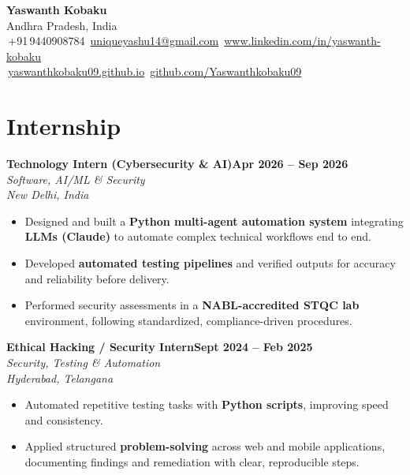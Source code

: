 \documentclass[a4paper,10pt]{article}
\newcommand{\linkedinicon}{\raisebox{-0.15ex}{\colorbox{accent}{\textcolor{white}{\scriptsize\textbf{in}}}}}
\newcommand{\entryloc}[4]{\textbf{#1}\hfill\textbf{#3}\\[1pt]{\itshape #2}\\{\itshape #4}\par\vspace{2pt}}
\begin{document}
\begin{center}
  {\LARGE\bfseries Yaswanth Kobaku}\\[2pt]
  Andhra Pradesh, India\\[2pt]
  {\small \Telefon\,+91\,9440908784 \quad \Letter\,\href{mailto:uniqueyashu14@gmail.com}{uniqueyashu14@gmail.com} \quad \linkedinicon\,\href{https://www.linkedin.com/in/yaswanth-kobaku}{www.linkedin.com/in/yaswanth-kobaku}}\\[2pt]
  {\small \Mundus\,\href{https://yaswanthkobaku09.github.io/}{yaswanthkobaku09.github.io} \quad \ComputerMouse\,\href{https://github.com/Yaswanthkobaku09}{github.com/Yaswanthkobaku09}}
\end{center}

\section*{Internship}
\entryloc{Technology Intern (Cybersecurity \& AI)}{Software, AI/ML \& Security}{Apr 2026 -- Sep 2026}{New Delhi, India}
\begin{itemize}
  \item Designed and built a \textbf{Python multi-agent automation system} integrating \textbf{LLMs (Claude)} to automate complex technical workflows end to end.
  \item Developed \textbf{automated testing pipelines} and verified outputs for accuracy and reliability before delivery.
  \item Performed security assessments in a \textbf{NABL-accredited STQC lab} environment, following standardized, compliance-driven procedures.
\end{itemize}
\vspace{3pt}
\entryloc{Ethical Hacking / Security Intern}{Security, Testing \& Automation}{Sept 2024 -- Feb 2025}{Hyderabad, Telangana}
\begin{itemize}
  \item Automated repetitive testing tasks with \textbf{Python scripts}, improving speed and consistency.
  \item Applied structured \textbf{problem-solving} across web and mobile applications, documenting findings and remediation with clear, reproducible steps.
\end{itemize}

\end{document}
